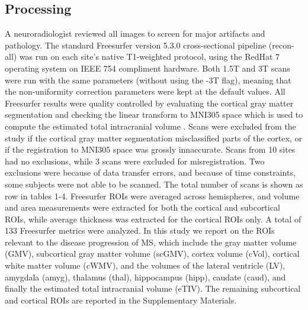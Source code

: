 \subsection{Processing}
 A neuroradiologist reviewed all images to screen for major artifacts and pathology. The standard Freesurfer \cite{freesurferPaper} version 5.3.0 cross-sectional pipeline (recon-all) was run on each site's native T1-weighted protocol, using the RedHat 7 operating system on IEEE 754 compliment hardware. Both 1.5T and 3T scans were run with the same parameters (without using the -3T flag), meaning that the non-uniformity correction parameters were kept at the default values. All Freesurfer results were quality controlled by evaluating the cortical gray matter segmentation and checking the  linear transform to MNI305 space which is used to compute the estimated total intracranial volume \cite{buckner2004unified}. Scans were excluded from the study if the cortical gray matter segmentation misclassified parts of the cortex, or if the registration to MNI305 space was grossly innaccurate. Scans from 10 sites had no exclusions, while 3 scans were excluded for misregistration. Two exclusions were because of data transfer errors, and because of time constraints, some subjects were not able to be scanned. The total number of scans is shown as row in tables 1-4. Freesurfer ROIs were averaged across hemispheres, and volume and area measurements were extracted for both the cortical and subcortical ROIs, while average thickness was extracted for the cortical ROIs only. A total of 133 Freesurfer metrics were analyzed. In this study we report on the ROIs relevant to the disease progression of MS, which include the gray matter volume (GMV), subcortical gray matter volume (scGMV), cortex volume (cVol), cortical white matter volume (cWMV), and the volumes of the lateral ventricle (LV), amygdala (amyg), thalamus (thal), hippocampus (hipp), caudate (caud), and finally the estimated total intracranial volume (eTIV). The remaining subcortical  and cortical ROIs are reported in the Supplementary Materials.